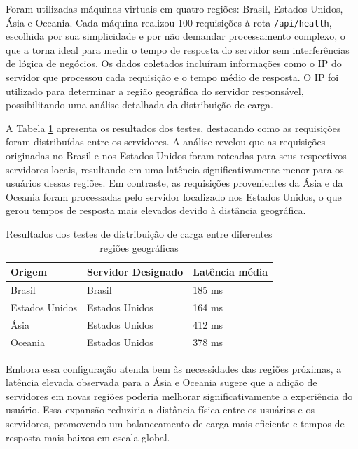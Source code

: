 Foram utilizadas máquinas virtuais em quatro regiões: Brasil, Estados Unidos, Ásia e Oceania. Cada máquina realizou 100 requisições à rota \texttt{/api/health}, escolhida por sua simplicidade e por não demandar processamento complexo, o que a torna ideal para medir o tempo de resposta do servidor sem interferências de lógica de negócios. Os dados coletados incluíram informações como o IP do servidor que processou cada requisição e o tempo médio de resposta. O IP foi utilizado para determinar a região geográfica do servidor responsável, possibilitando uma análise detalhada da distribuição de carga.


A Tabela \ref{tab:geo-distribution} apresenta os resultados dos testes, destacando como as requisições foram distribuídas entre os servidores. A análise revelou que as requisições originadas no Brasil e nos Estados Unidos foram roteadas para seus respectivos servidores locais, resultando em uma latência significativamente menor para os usuários dessas regiões. Em contraste, as requisições provenientes da Ásia e da Oceania foram processadas pelo servidor localizado nos Estados Unidos, o que gerou tempos de resposta mais elevados devido à distância geográfica.

\begin{table}[H]
    \centering
    \caption{Resultados dos testes de distribuição de carga entre diferentes regiões geográficas}
    \label{tab:geo-distribution}
    \begin{tabular}{|l|l|l|}
        \hline
        \textbf{Origem}   & \textbf{Servidor Designado} & \textbf{Latência média} \\ \hline
        Brasil         & Brasil                      & 185 ms                  \\ \hline
        Estados Unidos & Estados Unidos              & 164 ms                  \\ \hline
        Ásia           & Estados Unidos              & 412 ms                  \\ \hline
        Oceania        & Estados Unidos              & 378 ms                  \\ \hline
    \end{tabular}
\end{table}

Embora essa configuração atenda bem às necessidades das regiões próximas, a latência elevada observada para a Ásia e Oceania sugere que a adição de servidores em novas regiões poderia melhorar significativamente a experiência do usuário. Essa expansão reduziria a distância física entre os usuários e os servidores, promovendo um balanceamento de carga mais eficiente e tempos de resposta mais baixos em escala global.


